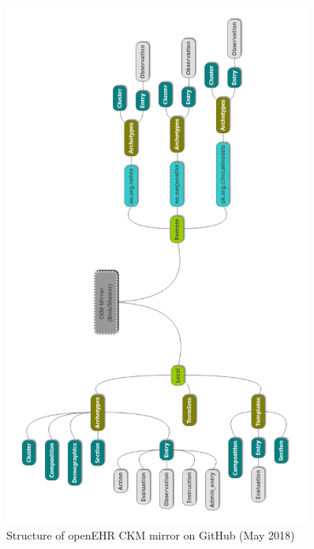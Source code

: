 \documentclass[mim_thesis.tex]{subfiles}
\begin{document}
\begin{figure}[H]
	\centering
    \includegraphics[width=0.9\textwidth]{img/CKM_mirror_organization.PNG}
	\caption{Structure of openEHR CKM mirror on GitHub (May 2018)}
	\label{fig:CKM_mirror_organization}
\end{figure}
\end{document}
